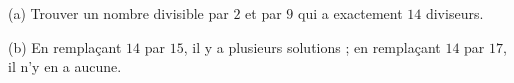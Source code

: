 (a) Trouver un nombre divisible par $2$ et par $9$ qui a exactement $14$ diviseurs.

(b) En remplaçant $14$ par $15$, il y a plusieurs solutions ; en remplaçant $14$ par $17$, il n'y en a aucune.
